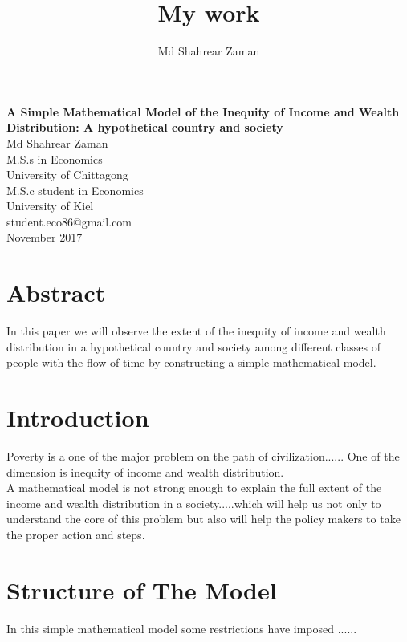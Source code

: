\documentclass[12pt,a4paper]{article}
\author{Md Shahrear Zaman}
\title{My work}
\begin{document}
	 \begin{center}
	 	{\textbf{\huge A Simple Mathematical Model of the Inequity of Income and Wealth Distribution: A hypothetical country and society }}	
	     \vspace{1.5cm}
	 	 \\ Md Shahrear Zaman
	 	 \bigskip
	 	 \\M.S.s in Economics
	 	 \\University of Chittagong
	 	 \\M.S.c student in Economics
	 	 \\University of Kiel
	 	 \medskip
	 	 \\student.eco86@gmail.com
	 	 \bigskip
	 	 \\November 2017
	 	 
	 	\end{center}
	\newpage
	\tableofcontents
	\newpage
	\section{Abstract}
In this paper we will observe the extent of the inequity of income and wealth distribution in a hypothetical country and society among different classes of people with the flow of time by constructing a simple mathematical model.		
		

	\section{Introduction}
Poverty is a one of the major problem on the path of civilization...... One of the dimension is inequity of income and wealth distribution. 
\medskip
\\A mathematical model is not strong enough to explain the full extent of the income and wealth distribution in a society.....which will help us not only to understand the core of this problem but also will help the policy makers to take the proper action and steps.                
                   
  \section{Structure of The Model}
	In this simple mathematical model some restrictions have imposed ......   
	
\end{document}
